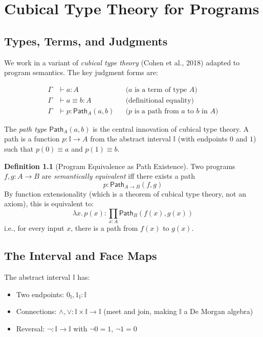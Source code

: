 \documentclass[11pt,a4paper]{report}
\theoremstyle{definition}
\newtheorem{definition}{Definition}[chapter]
\theoremstyle{plain}
\newcommand{\Path}{\mathsf{Path}}
\begin{document}
\chapter{Cubical Type Theory for Programs}
\label{ch:ctt}

\section{Types, Terms, and Judgments}

We work in a variant of \emph{cubical type theory} (Cohen et al., 2018)
adapted to program semantics.  The key judgment forms are:

\begin{align}
  \Gamma &\vdash a : A    && \text{($a$ is a term of type $A$)} \\
  \Gamma &\vdash a \equiv b : A && \text{(definitional equality)} \\
  \Gamma &\vdash p : \Path_A(a, b) && \text{($p$ is a path from $a$ to $b$ in $A$)}
\end{align}

The \emph{path type} $\Path_A(a, b)$ is the central innovation of
cubical type theory.  A path is a function $p : \mathbb{I} \to A$ from
the abstract interval $\mathbb{I}$ (with endpoints $0$ and $1$) such
that $p(0) \equiv a$ and $p(1) \equiv b$.

\begin{definition}[Program Equivalence as Path Existence]
Two programs $f, g : A \to B$ are \emph{semantically equivalent} iff
there exists a path
\[
  p : \Path_{A \to B}(f, g)
\]
By function extensionality (which is a theorem of cubical type theory,
not an axiom), this is equivalent to:
\[
  \lambda x.\, p(x) : \prod_{x:A} \Path_B(f(x), g(x))
\]
i.e., for every input $x$, there is a path from $f(x)$ to $g(x)$.
\end{definition}

\section{The Interval and Face Maps}

The abstract interval $\mathbb{I}$ has:
\begin{itemize}
  \item Two endpoints: $0_{\mathbb{I}}, 1_{\mathbb{I}} : \mathbb{I}$
  \item Connections: $\land, \lor : \mathbb{I} \times \mathbb{I} \to \mathbb{I}$
    (meet and join, making $\mathbb{I}$ a De Morgan algebra)
  \item Reversal: $\lnot : \mathbb{I} \to \mathbb{I}$ with
    $\lnot 0 = 1$, $\lnot 1 = 0$
\end{itemize}
\end{document}
